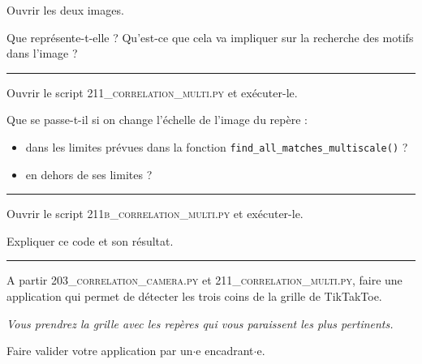 \documentclass[a4paper,12pt,titlepage]{article} %
\begin{document}
\Manip Ouvrir les deux images. 

\Quest Que représente-t-elle ? Qu'est-ce que cela va impliquer sur la recherche des motifs dans l'image ?

\noindent \rule{\linewidth}{1pt}

\Manip Ouvrir le script \textsc{211\_correlation\_multi.py} et exécuter-le.

\Quest Que se passe-t-il si on change l'échelle de l'image du repère : 

\begin{itemize}
	\item dans les limites prévues dans la fonction \texttt{find\_all\_matches\_multiscale()} ?
	\item en dehors de ses limites ?
\end{itemize} 

\noindent \rule{\linewidth}{1pt}

\Manip Ouvrir le script \textsc{211b\_correlation\_multi.py} et exécuter-le.

\Quest Expliquer ce code et son résultat.

\noindent \rule{\linewidth}{1pt}

\Manip A partir \textsc{203\_correlation\_camera.py} et \textsc{211\_correlation\_multi.py}, faire une application qui permet de détecter les trois coins de la grille de TikTakToe.

\textit{Vous prendrez la grille avec les repères qui vous paraissent les plus pertinents.}

\begin{mdframed}[style=sidebar,frametitle={}]
\large
Faire valider votre application par un$\cdot$e encadrant$\cdot$e.
\end{mdframed}


\end{document}
